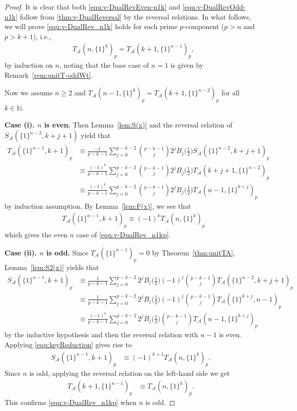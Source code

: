 \documentclass{article}
\newcommand{\calA}{\mathcal{A}}
\newcommand{\N}{\mathbb{N}}
\theoremstyle{plain}
\theoremstyle{definition}
\begin{document}
\begin{proof}
It is clear that both \eqref{equ:v-DualRevEven-n1k} and \eqref{equ:v-DualRevOdd-n1k} follow from \eqref{thm:v-DualReversal} by the reversal relations. In what follows, we will prove \eqref{equ:v-DualRev_n1k} holds for each prime $p$-component ($p>n$ and $p>k+1$), i.e.,
\begin{align}\label{equ:v-DualRev_n1kp}
&T_\calA(n,\{1\}^{k})_p=T_\calA(k+1,\{1\}^{n-1})_p,
\end{align}
by induction on $n$, noting that the base case of $n=1$ is given by Remark~\ref{rem:unitT-oddWt}.

Now we assume $n\ge 2$ and $T_\calA(n-1,\{1\}^{k})_p=T_\calA(k+1,\{1\}^{n-2})_p$ for all $k\in\N$.

\medskip
\noindent
\textbf{Case (i). $n$ is even.} Then Lemma~\ref{lem:S(x)} and the reversal relation of $S_\calA(\{1\}^{n-2},k+j+1)$ yield that
\begin{align*}
T_\calA (\{1\}^{n-1},k+1)_p&\equiv \frac{-1}{p-k-1}\sum_{j=0}^{p-k-2} \binom{p-k-1}{j}2^jB_j\Big(\frac12\Big)S_\calA(\{1\}^{n-2},k+j+1)_p\\
&\equiv \frac{(-1)^{k}}{p-k-1}\sum_{j=0}^{p-k-2} \binom{p-k-1}{j}2^jB_j\Big(\frac12\Big)T_\calA(k+j+1,\{1\}^{n-2})_p\\
&\equiv \frac{(-1)^{k}}{p-k-1}\sum_{j=0}^{p-k-2} \binom{p-k-1}{j}2^jB_j\Big(\frac12\Big)T_\calA(n-1,\{1\}^{k+j})_p
\end{align*}
by induction assumption. By Lemma~\ref{lem:F(x)}, we see that
\begin{align*}
&T_\calA(\{1\}^{n-1},k+1)_p \equiv (-1)^{k} T_\calA(n,\{1\}^{k})_p
\end{align*}
which gives the even $n$ case of \eqref{equ:v-DualRev_n1kp}.

\medskip
\noindent
\textbf{Case (ii). $n$ is odd.}  Since $T_\calA(\{1\}^{n-1})_p=0$ by Theorem~\ref{thm:unitTA}, Lemma~\ref{lem:S2(x)} yields that
\begin{align*}
S_\calA(\{1\}^{n-1},k+1)_p
&\equiv\frac{1}{p-k-1}\sum_{j=0}^{p-k-2}2^{j}B_{j}\Big(\frac12\Big)(-1)^{j}\binom{p-k-1}{j}T_\calA(\{1\}^{n-2},k+j+1)_p \\
&\equiv\frac{1}{p-k-1}\sum_{j=0}^{p-k-2}2^{j}B_{j}\Big(\frac12\Big)(-1)^{j}\binom{p-k-1}{j}T_\calA(\{1\}^{k+j},n-1)_p \\
&\equiv\frac{(-1)^{k}}{p-k-1}\sum_{j=0}^{p-k-2}2^{j}B_{j}\Big(\frac12\Big)\binom{p-k-1}{j} T_\calA(n-1,\{1\}^{k+j})_p
\end{align*}
by the inductive hypothesis and then the reversal relation with $n-1$ is even. Applying \eqref{equ:keyReduction} gives rise to
\begin{align*}
S_\calA(\{1\}^{n-1},k+1)_p & \equiv (-1)^{k+1} T_\calA(n,\{1\}^{k})_p.
\end{align*}
Since $n$ is odd, applying the reversal relation on the left-hand side we get
\begin{align*}
T_\calA(k+1,\{1\}^{n-1})_p & \equiv T_\calA(n,\{1\}^{k})_p.
\end{align*}
This confirms \eqref{equ:v-DualRev_n1kp} when $n$ is odd.


\end{proof}
\end{document}
